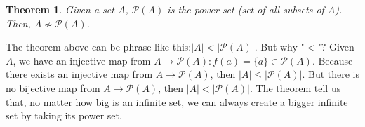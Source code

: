 \documentclass[12pt]{article}
\theoremstyle{definition}
\theoremstyle{plain}
\newtheorem{theorem}[definition]{Theorem}
\begin{document}
\begin{theorem}
Given a set $A$, $\mathcal{P}(A)$ is the power set (set of all subsets of $A$). Then, $A \not\sim \mathcal{P}(A)$.
\end{theorem}

\begin{note}
The theorem above can be phrase like this:$|A| < |\mathcal{P}(A)|$. But why "$<$"? Given $A$, we have an injective map from $A \rightarrow \mathcal{P}(A): f(a) = \{a\} \in \mathcal{P}(A)$. Because there exists an injective map from $A \rightarrow \mathcal{P}(A)$, then $|A| \le |\mathcal{P}(A)|$. But there is no bijective map from $A \rightarrow \mathcal{P}(A)$, then $|A| < |\mathcal{P}(A)|$. The theorem tell us that, no matter how big is an infinite set, we can always create a bigger infinite set by taking its power set.
\end{note}
\end{document}
